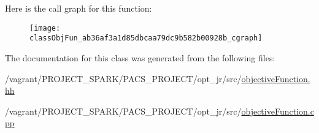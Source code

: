 Here is the call graph for this function\-:\nopagebreak
\begin{figure}[H]
\begin{center}
\leavevmode
\texttt{[image: classObjFun\_ab36af3a1d85dbcaa79dc9b582b00928b\_cgraph]}
\end{center}
\end{figure}




The documentation for this class was generated from the following files\-:\begin{DoxyCompactItemize}
\item 
/vagrant/\-P\-R\-O\-J\-E\-C\-T\-\_\-\-S\-P\-A\-R\-K/\-P\-A\-C\-S\-\_\-\-P\-R\-O\-J\-E\-C\-T/opt\-\_\-jr/src/\hyperlink{objectiveFunction_8hh}{objective\-Function.\-hh}\item 
/vagrant/\-P\-R\-O\-J\-E\-C\-T\-\_\-\-S\-P\-A\-R\-K/\-P\-A\-C\-S\-\_\-\-P\-R\-O\-J\-E\-C\-T/opt\-\_\-jr/src/\hyperlink{objectiveFunction_8cpp}{objective\-Function.\-cpp}\end{DoxyCompactItemize}
